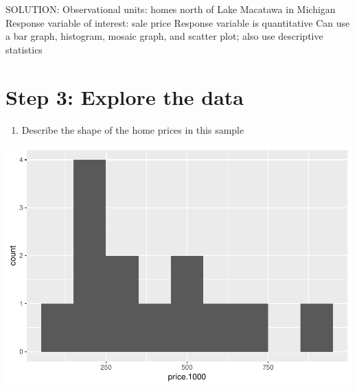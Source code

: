 \documentclass[]{article}
\newenvironment{Shaded}{\begin{snugshade}}{\end{snugshade}}
\newcommand{\KeywordTok}[1]{\textcolor[rgb]{0.13,0.29,0.53}{\textbf{#1}}}
\newcommand{\DataTypeTok}[1]{\textcolor[rgb]{0.13,0.29,0.53}{#1}}
\newcommand{\DecValTok}[1]{\textcolor[rgb]{0.00,0.00,0.81}{#1}}
\newcommand{\StringTok}[1]{\textcolor[rgb]{0.31,0.60,0.02}{#1}}
\newcommand{\OperatorTok}[1]{\textcolor[rgb]{0.81,0.36,0.00}{\textbf{#1}}}
\newcommand{\NormalTok}[1]{#1}
\providecommand{\tightlist}{%
  \setlength{\itemsep}{0pt}\setlength{\parskip}{0pt}}
\begin{document}
SOLUTION: Observational units: homes north of Lake Macatawa in Michigan
Response variable of interest: sale price Response variable is
quantitative Can use a bar graph, histogram, mosaic graph, and scatter
plot; also use descriptive statistics

\section{Step 3: Explore the data}\label{step-3-explore-the-data}

\begin{enumerate}
\def\labelenumi{\arabic{enumi}.}
\setcounter{enumi}{2}
\tightlist
\item
  Describe the shape of the home prices in this sample
\end{enumerate}

\begin{Shaded}
\end{Shaded}

\includegraphics{Michigan_Home_Prices_files/figure-latex/unnamed-chunk-2-1.pdf}

\begin{Shaded}
\end{Shaded}
\end{document}
